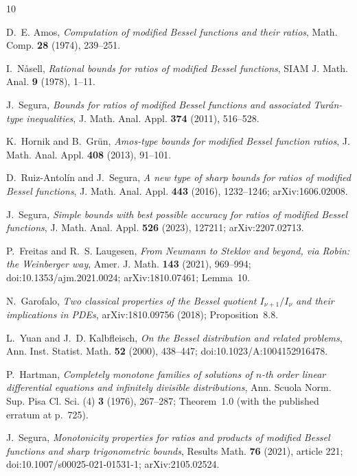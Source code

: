 \documentclass[11pt]{article}
\theoremstyle{remark}
\begin{document}
\begin{thebibliography}{10}

D.~E. Amos,
\emph{Computation of modified Bessel functions and their ratios},
Math. Comp. \textbf{28} (1974), 239--251.

I.~N{\aa}sell,
\emph{Rational bounds for ratios of modified Bessel functions},
SIAM J. Math. Anal. \textbf{9} (1978), 1--11.

J.~Segura,
\emph{Bounds for ratios of modified Bessel functions and associated
Tur\'an-type inequalities},
J. Math. Anal. Appl. \textbf{374} (2011), 516--528.

K.~Hornik and B.~Gr\"un,
\emph{Amos-type bounds for modified Bessel function ratios},
J. Math. Anal. Appl. \textbf{408} (2013), 91--101.

D.~Ruiz-Antol\'in and J.~Segura,
\emph{A new type of sharp bounds for ratios of modified Bessel
functions},
J. Math. Anal. Appl. \textbf{443} (2016), 1232--1246;
arXiv:1606.02008.

J.~Segura,
\emph{Simple bounds with best possible accuracy for ratios of modified
Bessel functions},
J. Math. Anal. Appl. \textbf{526} (2023), 127211; arXiv:2207.02713.

P.~Freitas and R.~S. Laugesen,
\emph{From Neumann to Steklov and beyond, via Robin: the Weinberger
way},
Amer. J. Math. \textbf{143} (2021), 969--994;
doi:10.1353/ajm.2021.0024; arXiv:1810.07461; Lemma~10.

N.~Garofalo,
\emph{Two classical properties of the Bessel quotient
$I_{\nu+1}/I_\nu$ and their implications in PDEs},
arXiv:1810.09756 (2018); Proposition~8.8.

L.~Yuan and J.~D. Kalbfleisch,
\emph{On the Bessel distribution and related problems},
Ann. Inst. Statist. Math. \textbf{52} (2000), 438--447;
doi:10.1023/A:1004152916478.

P.~Hartman,
\emph{Completely monotone families of solutions of $n$-th order linear
differential equations and infinitely divisible distributions},
Ann. Scuola Norm. Sup. Pisa Cl. Sci. (4) \textbf{3} (1976), 267--287;
Theorem~1.0 (with the published erratum at p.~725).

J.~Segura,
\emph{Monotonicity properties for ratios and products of modified
Bessel functions and sharp trigonometric bounds},
Results Math. \textbf{76} (2021), article 221;
doi:10.1007/s00025-021-01531-1; arXiv:2105.02524.


\end{thebibliography}
\end{document}
